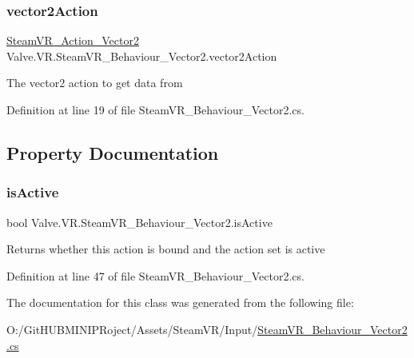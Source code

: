 \subsubsection{\texorpdfstring{vector2Action}{vector2Action}}
{\footnotesize\ttfamily \mbox{\hyperlink{class_valve_1_1_v_r_1_1_steam_v_r___action___vector2}{Steam\+V\+R\+\_\+\+Action\+\_\+\+Vector2}} Valve.\+V\+R.\+Steam\+V\+R\+\_\+\+Behaviour\+\_\+\+Vector2.\+vector2\+Action}



The vector2 action to get data from 



Definition at line 19 of file Steam\+V\+R\+\_\+\+Behaviour\+\_\+\+Vector2.\+cs.



\subsection{Property Documentation}
\mbox{\label{class_valve_1_1_v_r_1_1_steam_v_r___behaviour___vector2_a857c50030589218065d3abc4a692f891}} 
\subsubsection{\texorpdfstring{isActive}{isActive}}
{\footnotesize\ttfamily bool Valve.\+V\+R.\+Steam\+V\+R\+\_\+\+Behaviour\+\_\+\+Vector2.\+is\+Active\hspace{0.3cm}{\ttfamily [get]}}



Returns whether this action is bound and the action set is active 



Definition at line 47 of file Steam\+V\+R\+\_\+\+Behaviour\+\_\+\+Vector2.\+cs.



The documentation for this class was generated from the following file\+:\begin{DoxyCompactItemize}
\item 
O\+:/\+Git\+H\+U\+B\+M\+I\+N\+I\+P\+Roject/\+Assets/\+Steam\+V\+R/\+Input/\mbox{\hyperlink{_steam_v_r___behaviour___vector2_8cs}{Steam\+V\+R\+\_\+\+Behaviour\+\_\+\+Vector2.\+cs}}\end{DoxyCompactItemize}
